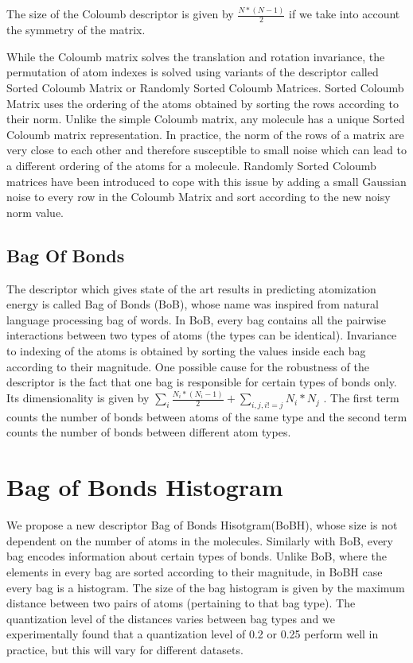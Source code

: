 \documentclass{article}
\begin{document}
The size of the Coloumb descriptor is given by $\frac{N*(N - 1)}{2}$ if we take into account the symmetry of the matrix.

While the Coloumb matrix solves the translation and rotation invariance, the permutation of atom indexes is solved using variants of the descriptor called Sorted Coloumb Matrix or Randomly Sorted Coloumb Matrices.  Sorted Coloumb Matrix uses the ordering of the atoms obtained by sorting the rows according to their norm. Unlike the simple Coloumb matrix, any molecule has a unique Sorted Coloumb matrix representation.
In practice,  the norm of the rows of a matrix are very close to each other and therefore susceptible to small noise which can lead to a different ordering of the atoms for a molecule. Randomly Sorted Coloumb matrices have been introduced to cope with this issue by adding a small Gaussian noise to every row in the Coloumb Matrix and sort according to the new noisy norm value.

\subsection{Bag Of Bonds}
The descriptor which gives state of the art results in predicting atomization energy is called Bag of Bonds (BoB), whose name was inspired from natural language processing bag of words. In BoB, every bag contains all the pairwise interactions between two types of atoms (the types can be identical). Invariance to indexing of the atoms is obtained by sorting the values inside each bag according to their magnitude.
One possible cause for the robustness of the descriptor is the fact that one bag is responsible for certain types of bonds only.
Its dimensionality  is given by $\sum_i \frac{N_i*(N_i-1)}{2} + \sum_{i,j, i!=j} N_i*N_j	$  .
The first term counts the number of bonds between atoms of the same type and the second term counts the number of bonds between different atom types.

\section{Bag of Bonds Histogram}
We propose a new descriptor Bag of Bonds Hisotgram(BoBH), whose size is not dependent on the number of atoms in the molecules. Similarly with BoB, every bag  encodes information about certain types of bonds. Unlike BoB, where the elements in every bag are sorted according to their magnitude, in BoBH case every bag is a histogram. The size of the bag histogram is given by the maximum distance between two pairs of atoms (pertaining to that bag type). The quantization level of the distances varies between bag types and we experimentally found that a quantization level of 0.2 or 0.25 perform well in practice, but this will vary for different datasets.
\end{document}
